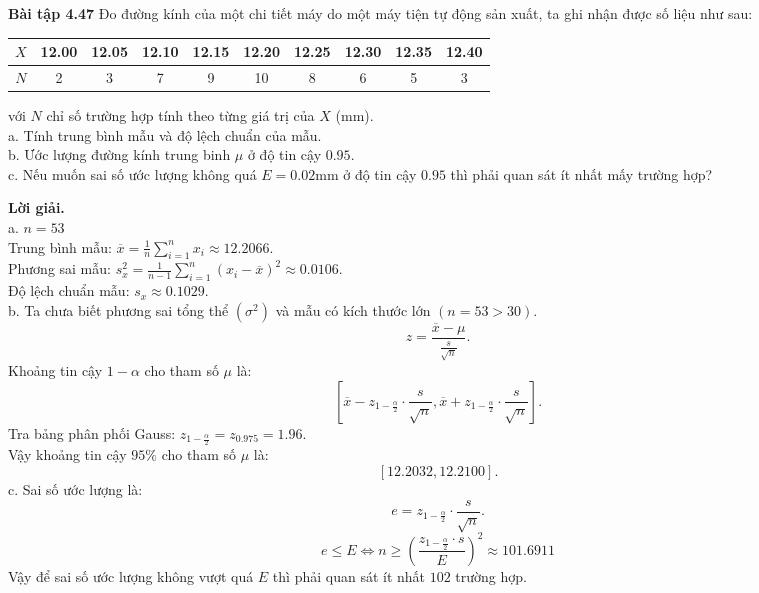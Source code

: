 \documentclass[12pt,a4paper]{article}
\begin{document}
\begin{mybox}
\textbf{Bài tập 4.47} Đo đường kính của một chi tiết máy do một máy tiện tự động sản xuất, ta ghi nhận được số liệu như sau:
\begin{table}[H]
\begin{tabular}{|c|c|c|c|c|c|c|c|c|c|}
\hline 
$X$ & 12.00 & 12.05 & 12.10 & 12.15 & 12.20 & 12.25 & 12.30 & 12.35 & 12.40 \\ 
\hline 
$N$ & 2 & 3 & 7 & 9 & 10 & 8 & 6 & 5 & 3 \\ 
\hline 
\end{tabular} 
\end{table}
với $N$ chỉ số trường hợp tính theo từng giá trị của $X$ ($\mathrm{mm}$).\\
a. Tính trung bình mẫu và độ lệch chuẩn của mẫu.\\
b. Ước lượng đường kính trung binh $\mu$ ở độ tin cậy $0.95$.\\
c. Nếu muốn sai số ước lượng không quá $E = 0.02 \mathrm{mm}$ ở độ tin cậy $0.95$ thì phải quan sát ít nhất mấy trường hợp?
\end{mybox} 
\textbf{Lời giải.} \\
a. $n = 53$\\
Trung bình mẫu:
$\overline x  = \frac{1}{n}\sum\limits_{i = 1}^n {{x_i}}  \approx 12.2066.$\\
Phương sai mẫu: $s_x^2 = \frac{1}{{n - 1}}\sum\limits_{i = 1}^n {{{\left( {{x_i} - \overline x } \right)}^2}}  \approx 0.0106.$\\
Độ lệch chuẩn mẫu: ${s_x} \approx 0.1029.$\\
b. Ta chưa biết phương sai tổng thể $\left( {\sigma^2} \right)$ và mẫu có kích thước lớn $\left( {n = 53 > 30} \right).$
$$z = \frac{\overline{x} - \mu}{\frac{s}{\sqrt{n}}}.$$
Khoảng tin cậy $1 - \alpha$ cho tham số $\mu$ là:
$$\left[ {\overline{x} - z_{1 - \frac{\alpha}{2}} \cdot \frac{s}{\sqrt{n}}, {\overline{x} + z_{1 - \frac{\alpha}{2}} \cdot \frac{s}{\sqrt{n}}}} \right].$$
Tra bảng phân phối Gauss: $z_{1 - \frac{\alpha}{2}} = z_{0.975} = 1.96.$\\
Vậy khoảng tin cậy $95\%$ cho tham số $\mu$ là:
$$\left[ {12.2032, 12.2100} \right].$$
c. Sai số ước lượng là:
$$e = z_{1 - \frac{\alpha}{2}} \cdot \frac{s}{\sqrt{n}}.$$
$$e \leqslant E \Leftrightarrow n \geqslant {\left( {\frac{{{z_{1 - \frac{\alpha }{2}}} \cdot s}}{E}} \right)^2} \approx 101.6911$$
Vậy để sai số ước lượng không vượt quá $E$ thì phải quan sát ít nhất $102$ trường hợp.
\end{document}
